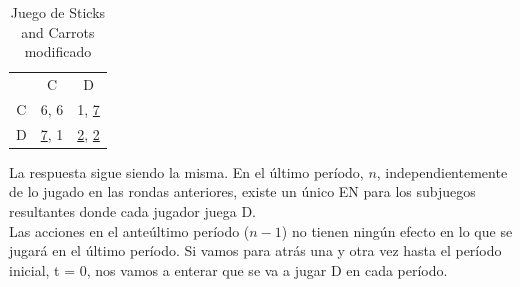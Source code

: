 \documentclass{article}
\newcommand{\ulcolor}[2][Red]{\setulcolor{#1}\ul{#2}}
\begin{document}
                \begin{table}[H]
                    \centering
                        \begin{tabular}{|c|c|c|}
                                & C     & D     \\
                            C   & 6, 6  & 1, \ulcolor[blue]{7}  \\
                            D   & \ulcolor[Red]{7}, 1  & \ulcolor[Red]{2}, \ulcolor[blue]{2}  \\
                        \end{tabular}
                    \caption{Juego de Sticks and Carrots modificado}
                \end{table}
                La respuesta sigue siendo la misma. En el último período, $n$, independientemente de lo jugado en las rondas anteriores, existe un único EN para los subjuegos resultantes donde cada jugador juega D. \\
                Las acciones en el anteúltimo período ($n-1$) no tienen ningún efecto en lo que se jugará en el último período. Si vamos para atrás una y otra vez hasta el período inicial, t = 0, nos vamos a enterar que se va a jugar D en cada período.
\end{document}
